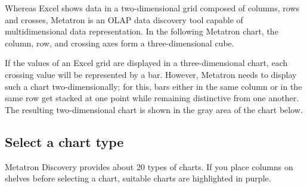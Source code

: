 \documentclass[letterpaper,10pt,english]{sphinxmanual}
\begin{document}
Whereas Excel shows data in a two-dimensional grid composed of columns, rows and crosses, Metatron is an OLAP data discovery tool capable of multidimensional data representation. In the following Metatron chart, the column, row, and crossing axes form a three-dimensional cube.
\begin{quote}

\begin{figure}[H]
\centering

\noindent{}
\end{figure}
\end{quote}

If the values of an Excel grid are displayed in a three-dimensional chart, each crossing value will be represented by a bar. However, Metatron needs to display such a chart two-dimensionally; for this, bars either in the same column or in the same row get stacked at one point while remaining distinctive from one another. The resulting two-dimensional chart is shown in the gray area of the chart below.
\begin{quote}

\begin{figure}[H]
\centering

\noindent{}
\end{figure}
\end{quote}


\subsection{Select a chart type}
\label{\detokenize{discovery/part04/chart_types:id1}}\label{\detokenize{discovery/part04/chart_types::doc}}


Metatron Discovery provides about 20 types of charts. If you place columns on shelves before selecting a chart, suitable charts are highlighted in purple.
\begin{quote}

\begin{figure}[H]
\centering

\noindent{}
\end{figure}
\end{quote}
\end{document}
